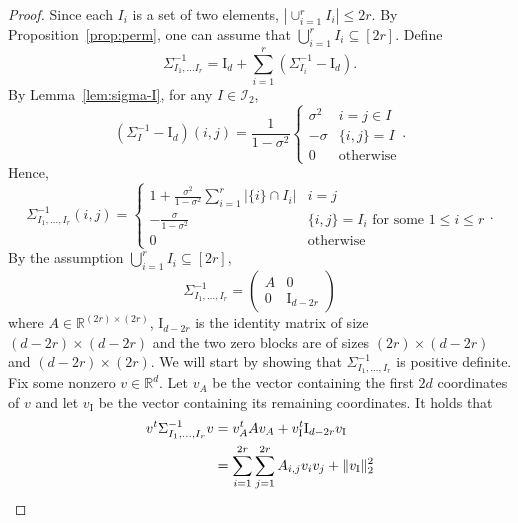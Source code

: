 \documentclass[final, 12pt]{colt2018}
\begin{document}
\begin{proof}
Since each $I_i$ is a set of two elements, $\left\lvert \cup_{i=1}^r I_i \right\rvert \le 2r$. By Proposition~\ref{prop:perm}, one can assume that $\bigcup_{i=1}^r I_i \subseteq [2r]$. 
Define
\[
\Sigma^{-1}_{I_1,\dots I_r} = 
\mathrm{I}_d + \sum_{i=1}^r \left( \Sigma_{I_i}^{-1} - \mathrm{I}_d \right).
\]
By Lemma~\ref{lem:sigma-I}, for any $I \in \mathcal{I}_2$,
\begin{equation} \label{eq:sigma-minus-I}
(\Sigma_{I}^{-1} - \mathrm{I}_d)(i,j)
= \frac{1}{1-\sigma^2} \begin{cases}
\sigma^2 & i = j \in I \\
-\sigma & \{i,j\} = I \\
0 & \text{otherwise}
\end{cases}.
\end{equation}
Hence,
\begin{equation} \label{eq:Adef}
\Sigma_{I_1,\dots,I_r}^{-1}(i,j) = \begin{cases}
1 + \frac{\sigma^2}{1-\sigma^2}\sum_{i=1}^r \lvert \{ i \} \cap I_i \rvert & i=j\\
-\frac{\sigma}{1-\sigma^2} &  \{i,j \} = I_i \text{ for some } 1 \le i \le r \\
0 & \text{otherwise}
\end{cases}.
\end{equation}
By the assumption $\bigcup_{i=1}^r I_i \subseteq [2r]$,
\begin{equation}\label{eq:sig-decomp}
\Sigma_{I_1,\dots,I_r}^{-1} = \begin{pmatrix}
A & 0 \\
0 & \mathrm{I}_{d-2r}
\end{pmatrix}
\end{equation}
where $A \in \mathbb{R}^{(2r) \times (2r)}$, $\mathrm{I}_{d-2r}$ is the identity matrix of size $(d-2r)\times (d-2r)$ and the two zero blocks are of sizes $(2r)\times (d-2r)$ and $(d-2r)\times(2r)$.
We will start by showing that $\Sigma^{-1}_{I_1,\dots,I_r}$ is positive definite. Fix some nonzero $v \in \mathbb{R}^{d}$. Let $v_A$ be the vector containing the first $2d$ coordinates of $v$ and let $v_{\mathrm{I}}$ be the vector containing its remaining coordinates. It holds that
\begin{align}
v^t \Sigma_{I_1,\dots,I_r}^{-1} v
&= v_A^t A v_A + v_{\mathrm{I}}^t \mathrm{I}_{d-2r} v_{\mathrm{I}} \notag\\
&=\sum_{i=1}^{2r} \sum_{j=1}^{2r} A_{i,j} v_i v_j + \lVert v_{\mathrm{I}} \rVert_2^2 \notag\\

\end{align}
\end{proof}
\end{document}
